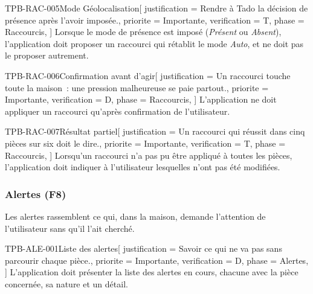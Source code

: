 \begin{exigence}{TPB-RAC-005}{Mode Géolocalisation}[
    justification = {Rendre à Tado la décision de présence après l'avoir imposée.},
    priorite      = {Importante},
    verification  = {T},
    phase         = {Raccourcis},
  ]
  Lorsque le mode de présence est imposé (\emph{Présent} ou \emph{Absent}), l'application
  doit proposer un raccourci qui rétablit le mode \emph{Auto}, et ne doit pas le proposer
  autrement.
\end{exigence}

\begin{exigence}{TPB-RAC-006}{Confirmation avant d'agir}[
    justification = {Un raccourci touche toute la maison~: une pression malheureuse se paie
                     partout.},
    priorite      = {Importante},
    verification  = {D},
    phase         = {Raccourcis},
  ]
  L'application ne doit appliquer un raccourci qu'après confirmation de l'utilisateur.
\end{exigence}

\begin{exigence}{TPB-RAC-007}{Résultat partiel}[
    justification = {Un raccourci qui réussit dans cinq pièces sur six doit le dire.},
    priorite      = {Importante},
    verification  = {T},
    phase         = {Raccourcis},
  ]
  Lorsqu'un raccourci n'a pas pu être appliqué à toutes les pièces, l'application doit
  indiquer à l'utilisateur lesquelles n'ont pas été modifiées.
\end{exigence}

\subsubsection{Alertes (F8)}
\label{sec:alertes}

Les alertes rassemblent ce qui, dans la maison, demande l'attention de l'utilisateur sans
qu'il l'ait cherché.

\begin{exigence}{TPB-ALE-001}{Liste des alertes}[
    justification = {Savoir ce qui ne va pas sans parcourir chaque pièce.},
    priorite      = {Importante},
    verification  = {D},
    phase         = {Alertes},
  ]
  L'application doit présenter la liste des alertes en cours, chacune avec la pièce
  concernée, sa nature et un détail.
\end{exigence}

